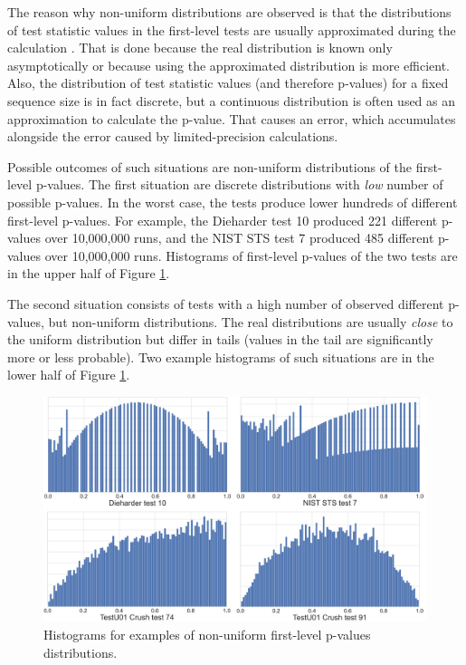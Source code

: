 \documentclass[
  digital,     %
  oneside,     %
  nosansbold,  %
  nocolorbold, %
  nolof,         %
  nolot,         %
]{fithesis4}
\begin{document}
The reason why non-uniform distributions are observed is that the distributions of test statistic values in the first-level tests are usually approximated during the calculation \cite[p. 7]{bad_day}. That is done because the real distribution is known only asymptotically or because using the approximated distribution is more efficient. Also, the distribution of test statistic values (and therefore p-values) for a fixed sequence size is in fact discrete, but a continuous distribution is often used as an approximation to calculate the p-value. That causes an error, which accumulates alongside the error caused by limited-precision calculations. 

Possible outcomes of such situations are non-uniform distributions of the first-level p-values. The first situation are discrete distributions with \emph{low} number of possible p-values. In the worst case, the tests produce lower hundreds of different first-level p-values. For example, the Dieharder test 10 produced 221 different p-values over 10,000,000 runs, and the NIST STS test 7 produced 485 different p-values over 10,000,000 runs. Histograms of first-level p-values of the two tests are in the upper half of Figure \ref{fig:uniforms}.

The second situation consists of tests with a high number of observed different p-values, but non-uniform distributions. The real distributions are usually \emph{close} to the uniform distribution but differ in tails (values in the tail are significantly more or less probable). Two example histograms of such situations are in the lower half of Figure \ref{fig:uniforms}.

\begin{figure}[h]
  \begin{center}
    \includegraphics[width=12.5cm]{figures/uniformity.png}
  \end{center}
  \caption{Histograms for examples of non-uniform first-level p-values distributions.}
  \label{fig:uniforms}
\end{figure}
\end{document}

